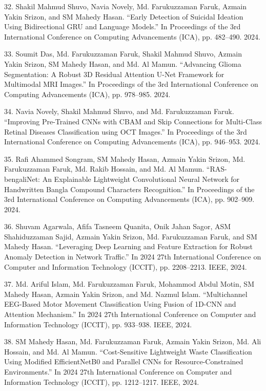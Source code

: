 \documentclass[a4paper,10pt]{article}
\newlength{\cvcolumngapwidth}
\newlength{\cvleftcolumnwidth}
\newlength{\cvrightcolumnwidth}
\newcommand{\cvdurationstyle}[1]{{\small\cvdurationfont\textcolor{cvdurationcolor}{#1}}}
\newlength{\cvafteritemskipamount}
\newlength{\cvparskip}
\newcommand{\cvitem}[2]{
    \begin{minipage}[t]{\cvleftcolumnwidth}
        \raggedleft #1
    \end{minipage}%
    \hspace{\cvcolumngapwidth}%
    \begin{minipage}[t]{\cvrightcolumnwidth}
        \setlength{\parskip}{\cvparskip} #2
    \end{minipage}

    \vspace{\cvafteritemskipamount}
}
\begin{document}
\cvitem{
    \cvdurationstyle{}
}{
32. Shakil Mahmud Shuvo, Navia Novely, Md. Farukuzzaman Faruk, Azmain Yakin Srizon, and SM Mahedy Hasan. “Early Detection of Suicidal Ideation Using Bidirectional GRU and Language Models.” In Proceedings of the 3rd International Conference on Computing Advancements (ICA), pp. 482–490. 2024.
}

\cvitem{
    \cvdurationstyle{}
}{
33. Soumit Das, Md. Farukuzzaman Faruk, Shakil Mahmud Shuvo, Azmain Yakin Srizon, SM Mahedy Hasan, and Md. Al Mamun. “Advancing Glioma Segmentation: A Robust 3D Residual Attention U-Net Framework for Multimodal MRI Images.” In Proceedings of the 3rd International Conference on Computing Advancements (ICA), pp. 978–985. 2024.
}

\cvitem{
    \cvdurationstyle{}
}{
34. Navia Novely, Shakil Mahmud Shuvo, and Md. Farukuzzaman Faruk. “Improving Pre-Trained CNNs with CBAM and Skip Connections for Multi-Class Retinal Diseases Classification using OCT Images.” In Proceedings of the 3rd International Conference on Computing Advancements (ICA), pp. 946–953. 2024.
}

\cvitem{
    \cvdurationstyle{}
}{
35. Rafi Ahammed Songram, SM Mahedy Hasan, Azmain Yakin Srizon, Md. Farukuzzaman Faruk, Md. Rakib Hossain, and Md. Al Mamun. “RAS-bengaliNet: An Explainable Lightweight Convolutional Neural Network for Handwritten Bangla Compound Characters Recognition.” In Proceedings of the 3rd International Conference on Computing Advancements (ICA), pp. 902–909. 2024.
}

\cvitem{
    \cvdurationstyle{}
}{
36. Shuvam Agarwala, Afifa Tasneem Quanita, Onik Jahan Sagor, ASM Shahiduzzaman Sajid, Azmain Yakin Srizon, Md. Farukuzzaman Faruk, and SM Mahedy Hasan. “Leveraging Deep Learning and Feature Extraction for Robust Anomaly Detection in Network Traffic.” In 2024 27th International Conference on Computer and Information Technology (ICCIT), pp. 2208–2213. IEEE, 2024.
}

\cvitem{
    \cvdurationstyle{}
}{
37. Md. Ariful Islam, Md. Farukuzzaman Faruk, Mohammod Abdul Motin, SM Mahedy Hasan, Azmain Yakin Srizon, and Md. Nazmul Islam. “Multichannel EEG-Based Motor Movement Classification Using Fusion of 1D-CNN and Attention Mechanism.” In 2024 27th International Conference on Computer and Information Technology (ICCIT), pp. 933–938. IEEE, 2024.
}

\cvitem{
    \cvdurationstyle{}
}{
38. SM Mahedy Hasan, Md. Farukuzzaman Faruk, Azmain Yakin Srizon, Md. Ali Hossain, and Md. Al Mamun. “Cost-Sensitive Lightweight Waste Classification Using Modified EfficientNetB0 and Parallel CNNs for Resource-Constrained Environments.” In 2024 27th International Conference on Computer and Information Technology (ICCIT), pp. 1212–1217. IEEE, 2024.
}
\end{document}
